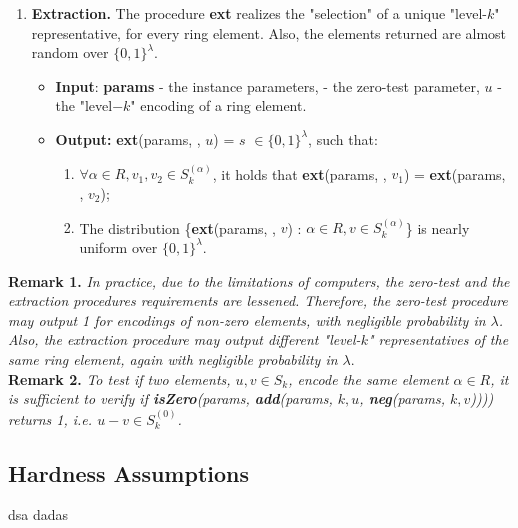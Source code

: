 \begin{enumerate}[label=(\alph*)]
	\item \textbf{Extraction.} The procedure \textbf{ext} realizes the "selection" of a unique "level-$k$" representative, for every ring element. Also, the elements returned are almost random over $\{0, 1\}^\lambda$.
	\begin{itemize}
		\item \textbf{Input}: \textbf{params} - the instance parameters, {\pzt} - the zero-test parameter, {\boldmath$u$} - the "level$-k$" encoding of a ring element.
		\item \textbf{Output:} \textbf{ext}(params, {\pzt}, $u$) = {\boldmath$s$} $\in \{0,1\}^\lambda$, such that:
		\begin{enumerate}[label=(\roman*)]
			\item $\forall \alpha \in R, v_1,v_2\in S_k^{(\alpha)}$, it holds that \textbf{ext}(params, {\pzt}, $v_1$) = \textbf{ext}(params, {\pzt}, $v_2$);
			\item The distribution \{\textbf{ext}(params, {\pzt}, $v$) : $\alpha \in R, v \in S_k^{(\alpha)}$\} is nearly uniform over $\{0,1\}^\lambda$.
		\end{enumerate}
	\end{itemize}
	
	
\end{enumerate}

\textbf{Remark 1.} \textit{In practice, due to the limitations of computers, the zero-test and the extraction procedures requirements are lessened. Therefore, the zero-test procedure may output 1 for encodings of non-zero elements, with negligible probability in $\lambda$. Also, the extraction procedure may output different "level-$k$" representatives of the same ring element, again with negligible probability in $\lambda$}.\\

\textbf{Remark 2.} \textit{To test if two elements, $u, v\in S_k$, encode the same element $\alpha \in R$, it is sufficient to verify if \textbf{isZero}(params, \textbf{add}(params, $k, u$, \textbf{neg}(params, $k, v$)))) returns 1, i.e. $u - v \in S_k^{(0)}$.}

\subsection{Hardness Assumptions}

dsa dadas
